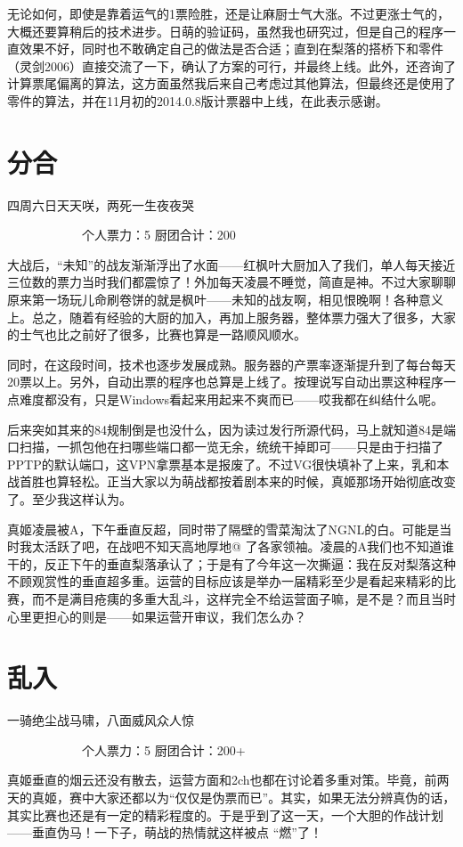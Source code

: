 无论如何，即使是靠着运气的1票险胜，还是让麻厨士气大涨。不过更涨士气的，大概还要算稍后的技术进步。日萌的验证码，虽然我也研究过，但是自己的程序一直效果不好，同时也不敢确定自己的做法是否合适；直到在梨落的搭桥下和零件（灵剑2006）直接交流了一下，确认了方案的可行，并最终上线。此外，还咨询了计算票尾偏离的算法，这方面虽然我后来自己考虑过其他算法，但最终还是使用了零件的算法，并在11月初的2014.0.8版计票器中上线，在此表示感谢。


\section{分合}
四周六日天天咲，两死一生夜夜哭

　　　　　　个人票力：5 厨团合计：200

大战后，“未知”的战友渐渐浮出了水面——红枫叶大厨加入了我们，单人每天接近三位数的票力当时我们都震惊了！外加每天凌晨不睡觉，简直是神。不过大家聊聊原来第一场玩儿命刷卷饼的就是枫叶——未知的战友啊，相见恨晚啊！各种意义上。总之，随着有经验的大厨的加入，再加上服务器，整体票力强大了很多，大家的士气也比之前好了很多，比赛也算是一路顺风顺水。

同时，在这段时间，技术也逐步发展成熟。服务器的产票率逐渐提升到了每台每天20票以上。另外，自动出票的程序也总算是上线了。按理说写自动出票这种程序一点难度都没有，只是Windows看起来用起来不爽而已——哎我都在纠结什么呢。

后来突如其来的84规制倒是也没什么，因为读过发行所源代码，马上就知道84是端口扫描，一抓包他在扫哪些端口都一览无余，统统干掉即可——只是由于扫描了PPTP的默认端口，这VPN拿票基本是报废了。不过VG很快填补了上来，乳和本战首胜也算轻松。正当大家以为萌战都按着剧本来的时候，真姬那场开始彻底改变了。至少我这样认为。

真姬凌晨被A，下午垂直反超，同时带了隔壁的雪菜淘汰了NGNL的白。可能是当时我太活跃了吧，在战吧不知天高地厚地@ 了各家领袖。凌晨的A我们也不知道谁干的，反正下午的垂直梨落承认了；于是有了今年这一次撕逼：我在反对梨落这种不顾观赏性的垂直超多重。运营的目标应该是举办一届精彩至少是看起来精彩的比赛，而不是满目疮痍的多重大乱斗，这样完全不给运营面子嘛，是不是？而且当时心里更担心的则是——如果运营开审议，我们怎么办？


\section{乱入}
一骑绝尘战马啸，八面威风众人惊

　　　　　　个人票力：5 厨团合计：200+

真姬垂直的烟云还没有散去，运营方面和2ch也都在讨论着多重对策。毕竟，前两天的真姬，赛中大家还都以为“仅仅是伪票而已”。其实，如果无法分辨真伪的话，其实比赛也还是有一定的精彩程度的。于是乎到了这一天，一个大胆的作战计划——垂直伪马！一下子，萌战的热情就这样被点 “燃”了！

